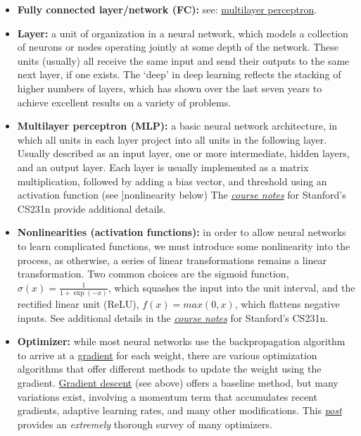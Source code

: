 \begin{itemize}
\item \textbf{Fully connected layer/network (FC):\label{tg:fc}} see: \hyperref[tg:mlp]{multilayer perceptron}.

\item \textbf{Layer:\label{tg:layer}} a unit of organization in a neural network, which models a collection of neurons or nodes operating jointly at some depth of the network. These units (usually) all receive the same input and send their outputs to the same next layer, if one exists. The `deep' in deep learning reflects the stacking of higher numbers of layers, which has shown over the last seven years to achieve excellent results on a variety of problems.

\item \textbf{Multilayer perceptron (MLP):\label{tg:mlp}} a basic neural network architecture, in which all units in each layer project into all units in the following layer. Usually described as an input layer, one or more intermediate, hidden layers, and an output layer. Each layer is usually implemented as a matrix multiplication, followed by adding a bias vector, and threshold using an activation function (see \hyperref[tg:nonlinearity]]{nonlinearity} below) The \href{http://cs231n.github.io/neural-networks-1/\#layers}{\emph{course notes}} for Stanford's CS231n provide additional details.

\item \textbf{Nonlinearities (activation functions):\label{tg:nonlinearity}} in order to allow neural networks to learn complicated functions, we must introduce some nonlinearity into the process, as otherwise, a series of linear transformations remains a linear transformation. Two common choices are the sigmoid function, $\sigma(x) = \frac{1}{1 + \exp(-x)}$, which squashes the input into the unit interval, and the rectified linear unit (ReLU), $f(x) = max(0, x)$, which flattens negative inputs. See additional details in the \href{http://cs231n.github.io/neural-networks-1/\#actfun}{\emph{course notes}} for Stanford's CS231n.

\item \textbf{Optimizer:\label{tg:optimizer}} while most neural networks use the backpropagation algorithm to arrive at a \hyperref[tg:gradient]{gradient} for each weight, there are various optimization algorithms that offer different methods to update the weight using the gradient. \hyperref[tg:sgd]{Gradient descent} (see above) offers a baseline method, but many variations exist, involving a momentum term that accumulates recent gradients, adaptive learning rates, and many other modifications. This \href{http://ruder.io/optimizing-gradient-descent/}{\emph{post}} provides an \emph{extremely} thorough survey of many optimizers.


\end{itemize}
